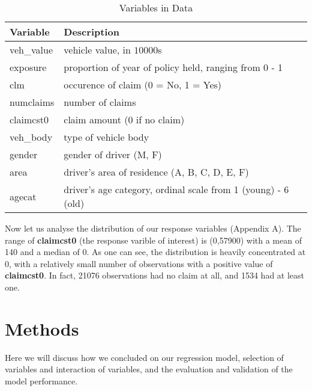\documentclass[a4paper]{article}\usepackage[]{graphicx}\usepackage[]{color}
\begin{document}
\begin{table}[h]
\begin{center}
\begin{tabular}{|l|l|}
\hline
\textbf{Variable} & \textbf{Description}        \\ \hline
veh\_value         & vehicle value, in $10000$s             \\ \hline
exposure      & proportion of year of policy held, ranging from 0 - 1     \\ \hline
clm             & occurence of claim (0 = No, 1 = Yes)                                  \\ \hline
numclaims         & number of claims                                                               \\ \hline
claimcst0        & claim amount (0 if no claim)                                                    \\ \hline
veh\_body             &  type of vehicle body                                      \\ \hline
gender             & gender of driver (M, F)                                    \\ \hline
area             & driver's area of residence (A, B, C, D, E, F)                               \\ \hline
agecat           & driver's age category, ordinal scale from 1 (young) - 6 (old)        \\ \hline
\end{tabular}
\vspace{-5pt}
\caption{Variables in Data}
\end{center}
\end{table}

Now let us analyse the distribution of our response variables (Appendix A). The range of \textbf{claimcst0} (the response varible of interest) is (0,57900) with a mean of 140 and a median of 0. As one can see, the distribution is heavily concentrated at 0, with a relatively small number of observations with a positive value of \textbf{claimcst0}. In fact, 21076 observations had no claim at all, and 1534 had at least one. 

\section*{Methods}

Here we will discuss how we concluded on our regression model, selection of variables and interaction of variables, and the evaluation and validation of the model performance. 
\end{document}
